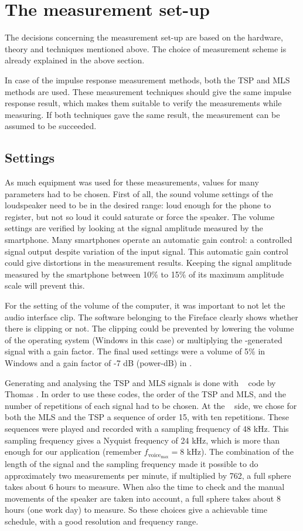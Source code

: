 

\section{The measurement set-up}
The decisions concerning the measurement set-up are based on the hardware, theory and techniques mentioned above. The choice of measurement scheme is already explained in the above section.

In case of the impulse response measurement methods, both the TSP and MLS methods are used.
These measurement techniques should give the same impulse response result, which makes them suitable to verify the measurements while measuring.
If both techniques gave the same result, the measurement can be assumed to be succeeded. 

\subsection{Settings}
As much equipment was used for these measurements, values for many parameters had to be chosen.
First of all, the sound volume settings of the loudspeaker need to be in the desired range: loud enough for the phone to register, but not so loud it could saturate or force the speaker.
The volume settings are verified by looking at the signal amplitude measured by the smartphone. Many smartphones operate an automatic gain control: a controlled signal output despite variation of the input signal. This automatic gain control could give distortions in the measurement results. Keeping the signal amplitude measured by the smartphone between 10\% to 15\% of its maximum amplitude scale will prevent this. 

For the setting of the volume of the computer, it was important to not let the audio interface clip.
The software belonging to the Fireface clearly shows whether there is clipping or not. 
The clipping could be prevented by lowering the volume of the operating system (Windows in this case) or multiplying the \matlab-generated signal with a gain factor.
The final used settings were a volume of 5\% in Windows and a gain factor of -7 dB (power-dB) in \matlab.

Generating and analysing the TSP and MLS signals is done with \matlab~ code by Thomas \cite{Thomas2006}.
In order to use these codes, the order of the TSP and MLS, and the number of repetitions of each signal had to be chosen.
At the \matlab~ side, we chose for both the MLS and the TSP a sequence of order 15, with ten repetitions.
These sequences were played and recorded with a sampling frequency of 48 kHz.
This sampling frequency gives a Nyquist frequency of 24 kHz, which is more than enough for our application (remember $f_{\text{voice}_\text{max}}=8$ kHz).
The combination of the length of the signal and the sampling frequency made it possible to do approximately two measurements per minute, if multiplied by 762, a full sphere takes about 6 hours to measure.
When also the time to check and the manual movements of the speaker are taken into account, a full sphere takes about 8 hours (one work day) to measure.
So these choices give a achievable time schedule, with a good resolution and frequency range.

